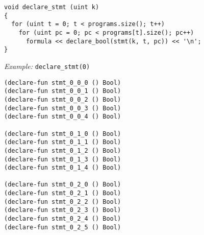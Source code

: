 





\begin{lstlisting}[style=c++]
void declare_stmt (uint k)
{
  for (uint t = 0; t < programs.size(); t++)
    for (uint pc = 0; pc < programs[t].size(); pc++)
      formula << declare_bool(stmt(k, t, pc)) << '\n';
}
\end{lstlisting}

\newpage

\noindent
\emph{Example:} \lstinline[style=c++]{declare_stmt(0)}

\begin{lstlisting}[language=SMTLib]
(declare-fun stmt_0_0_0 () Bool)
(declare-fun stmt_0_0_1 () Bool)
(declare-fun stmt_0_0_2 () Bool)
(declare-fun stmt_0_0_3 () Bool)
(declare-fun stmt_0_0_4 () Bool)

(declare-fun stmt_0_1_0 () Bool)
(declare-fun stmt_0_1_1 () Bool)
(declare-fun stmt_0_1_2 () Bool)
(declare-fun stmt_0_1_3 () Bool)
(declare-fun stmt_0_1_4 () Bool)

(declare-fun stmt_0_2_0 () Bool)
(declare-fun stmt_0_2_1 () Bool)
(declare-fun stmt_0_2_2 () Bool)
(declare-fun stmt_0_2_3 () Bool)
(declare-fun stmt_0_2_4 () Bool)
(declare-fun stmt_0_2_5 () Bool)
\end{lstlisting}

